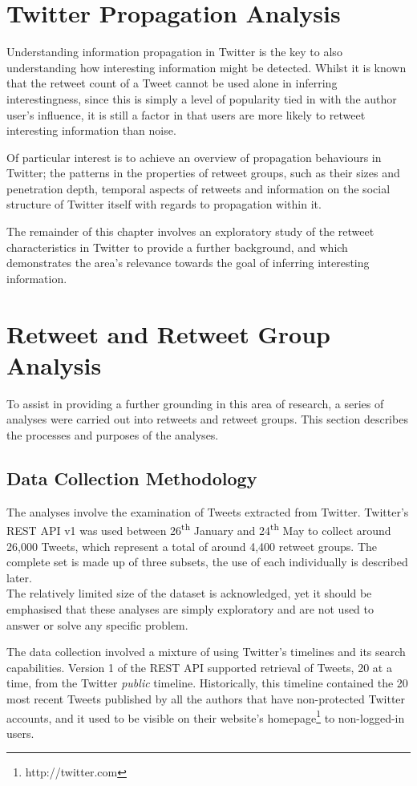 \section{Twitter Propagation Analysis}
Understanding information propagation in Twitter is the key to also understanding how interesting information might be detected. Whilst it is known that the retweet count of a Tweet cannot be used alone in inferring interestingness, since this is simply a level of popularity tied in with the author user's influence, it is still a factor in that users are more likely to retweet interesting information than noise.

Of particular interest is to achieve an overview of propagation behaviours in Twitter; the patterns in the properties of retweet groups, such as their sizes and penetration depth, temporal aspects of retweets and information on the social structure of Twitter itself with regards to propagation within it.

The remainder of this chapter involves an exploratory study of the retweet characteristics in Twitter to provide a further background, and which demonstrates the area's relevance towards the goal of inferring interesting information.


\section{Retweet and Retweet Group Analysis}
To assist in providing a further grounding in this area of research, a series of analyses were carried out into retweets and retweet groups. This section describes the processes and purposes of the analyses.


\subsection{Data Collection Methodology}
The analyses involve the examination of Tweets extracted from Twitter. Twitter's REST API v1 was used between 26\textsuperscript{th} January and 24\textsuperscript{th} May to collect around 26,000 Tweets, which represent a total of around 4,400 retweet groups. The complete set is made up of three subsets, the use of each individually is described later.\\
The relatively limited size of the dataset is acknowledged, yet it should be emphasised that these analyses are simply exploratory and are not used to answer or solve any specific problem.

The data collection involved a mixture of using Twitter's timelines and its search capabilities. Version 1 of the REST API supported retrieval of Tweets, 20 at a time, from the Twitter \textit{public} timeline. Historically, this timeline contained the 20 most recent Tweets published by all the authors that have non-protected Twitter accounts, and it used to be visible on their website's homepage\footnote{http://twitter.com} to non-logged-in users.


